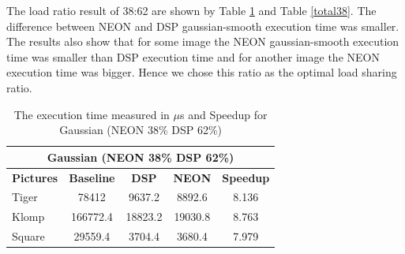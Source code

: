 \documentclass[conference]{IEEEtran}
\begin{document}
The load ratio result of 38:62 are shown by Table \ref{gauss38} and Table \ref{total38}. The difference between NEON and DSP gaussian-smooth execution time was smaller. The results also show that for some image the NEON gaussian-smooth execution time was smaller than DSP execution time and for another image the NEON execution time was bigger. Hence we chose this ratio as the optimal load sharing ratio.

\begin{table}[!ht]
\centering
\caption{The execution time measured in  $\mu$s and Speedup for Gaussian (NEON 38\% DSP 62\%)}
\label{gauss38}
\begin{tabular}{|l|c|c|c|c|}
\hline
\multicolumn{5}{|c|}{\textbf{Gaussian (NEON 38\% DSP 62\%)}}                                                                       \\ \hline
\multicolumn{1}{|c|}{\textbf{Pictures}} & \textbf{Baseline} & \textbf{DSP} & \textbf{NEON} & \textbf{Speedup} \\ \hline
Tiger                                   & 78412           & 9637.2      & 8892.6        & 8.136          \\ \hline
Klomp                                   & 166772.4          & 18823.2      & 19030.8       & 8.763          \\ \hline
Square                                  & 29559.4           & 3704.4       & 3680.4        & 7.979          \\ \hline
\end{tabular}
\end{table}
\end{document}
